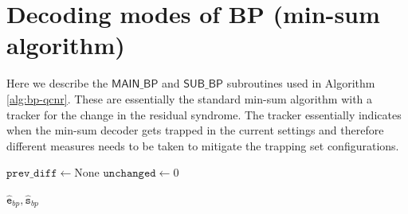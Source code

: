 \documentclass[%
 reprint,
 amsmath,amssymb,
 aps,
pra,
showkeys,
]{revtex4-2}
\begin{document}
\section{Decoding modes of BP (min-sum algorithm)}
Here we describe the $\mathsf{MAIN\_BP}$ and $\mathsf{SUB\_BP}$ subroutines used in Algorithm \ref{alg:bp-qcnr}.
These are essentially the standard min-sum algorithm with a tracker for the change in the residual syndrome.
The tracker essentially indicates when the min-sum decoder gets trapped in the current settings and therefore different measures needs to be taken to mitigate the trapping set configurations.
\begin{algorithm}
\caption{MAIN\_BP / SUB\_BP}\label{alg:main_bp}


$\mathtt{prev\_diff} \gets \text{None}$\;
$\mathtt{unchanged} \gets 0$\;

\BlankLine
{}

\BlankLine
\Return $\hat{\mathtt{e}}_{bp}, \hat{\mathtt{s}}_{bp}$

\end{algorithm}
\newpage

% 
\end{document}
